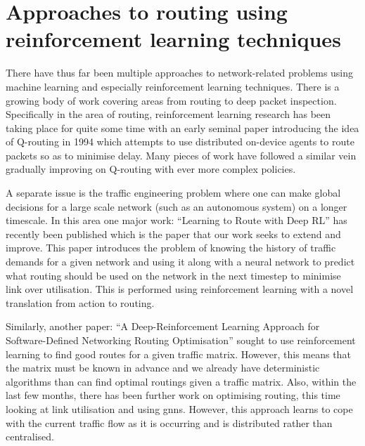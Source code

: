 \section{Approaches to routing using reinforcement learning techniques}

There have thus far been multiple approaches to network-related problems using machine learning and especially reinforcement learning techniques\cite{luong2019applications}. There is a growing body of work covering areas from routing to deep packet inspection. Specifically in the area of routing, reinforcement learning research has been taking place for quite some time with an early seminal paper introducing the idea of Q-routing in 1994\cite{boyan1994packet} which attempts to use distributed on-device agents to route packets so as to minimise delay. Many pieces of work have followed a similar vein gradually improving on Q-routing with ever more complex policies\cite{you2019toward,Ali2019HierarchicalDD}.

A separate issue is the traffic engineering problem where one can make global decisions for a large scale network (such as an autonomous system) on a longer timescale. In this area one major work: ``Learning to Route with Deep RL''\cite{valadarsky2017learning} has recently been published which is the paper that our work seeks to extend and improve. This paper introduces the problem of knowing the history of traffic demands for a given network and using it along with a neural network to predict what routing should be used on the network in the next timestep to minimise link over utilisation. This is performed using reinforcement learning with a novel translation from action to routing.

Similarly, another paper: ``A Deep-Reinforcement Learning Approach for Software-Defined Networking Routing Optimisation''\cite{stampa2017deep} sought to use reinforcement learning to find good routes for a given traffic matrix. However, this means that the matrix must be known in advance and we already have deterministic algorithms than can find optimal routings given a traffic matrix. Also, within the last few months, there has been further work on optimising routing, this time looking at link utilisation and using \acp{gnn}\cite{Sawada2020NetworkRO}. However, this approach learns to cope with the current traffic flow as it is occurring and is distributed rather than centralised.
